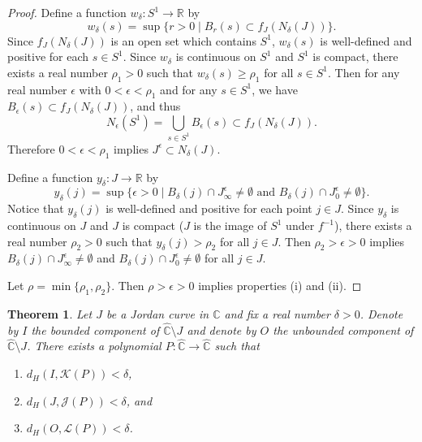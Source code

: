 \documentclass[a4paper,11pt,onecolumn]{amsart}
\newtheorem{theorem}{Theorem}[section]
\theoremstyle{definition}
\begin{document}
\begin{proof}
Define a function $w_{\delta}:S^1 \rightarrow \mathbb{R}$ by 
$$w_{\delta}(s) = \sup \{r>0 \mid B_r(s) \subset f_J(N_{\delta}(J))\}.$$
Since $f_J(N_{\delta}(J))$ is an open set which contains $S^1$,  $w_{\delta}(s)$ is well-defined and positive for each $s \in S^1$.  Since $w_{\delta}$ is continuous on $S^1$ and $S^1$ is compact, there exists a real number $ \rho_1 > 0$ such that $w_{\delta}(s) \geq \rho_1$ for all $s \in S^1$.  Then for any real number $\epsilon$ with $0 < \epsilon < \rho_1$ and for any $s \in S^1$, we have 
$B_{\epsilon}(s) \subset f_J(N_{\delta}(J))$, and thus $$N_{\epsilon}(S^1) = \bigcup_{s \in S^1} B_{\epsilon}(s)  \subset f_J(N_{\delta}(J)).$$ Therefore $0 < \epsilon < \rho_1$ implies $J^{\epsilon} \subset N_{\delta}(J)$. 

Define a function $y_{\delta}:J \rightarrow \mathbb{R}$ by 
$$y_{\delta}(j) =  \sup \{\epsilon > 0 \mid B_{\delta}(j) \cap J^{\epsilon}_{\infty} \not = \emptyset \textrm{ and } B_{\delta}(j) \cap J^{\epsilon}_0 \not = \emptyset  \}.$$  Notice that $y_{\delta}(j)$ is well-defined and positive for each point $j \in J$.  Since $y_{\delta}$ is continuous on $J$ and $J$ is compact ($J$ is the image of $S^1$ under $f^{-1}$), there exists a real number $\rho_2 > 0$ such that $y_{\delta}(j) > \rho_2$ for all $j \in J$.  Then $\rho_2 > \epsilon > 0$ implies $B_{\delta}(j) \cap J_{\infty}^{\epsilon} \not = \emptyset$ and $B_{\delta}(j) \cap J_0^{\epsilon} \not = \emptyset$ for all $j \in J$.  

Let $\rho = \min\{\rho_1, \rho_2\}$.  Then $\rho>\epsilon > 0$ implies properties (i) and (ii). 
\end{proof}

\begin{theorem} \label{t:HausdorffVersion}
Let $J$ be a Jordan curve in $\mathbb{C}$ and fix a real number $\delta > 0$.   Denote by $I$ the bounded component of $\hat{\mathbb{C}}\setminus J$ and denote by $O$ the unbounded component of $\hat{\mathbb{C}}\setminus J$.  There exists a polynomial $P:\hat{\mathbb{C}} \rightarrow \hat{\mathbb{C}}$ such that 
\begin{enumerate}
\item $d_H(I, \mathcal{K}(P)) < \delta$,
\item $d_H(J, \mathcal{J}(P)) < \delta$, and 
\item $d_H(O, \mathcal{L}(P)) < \delta$. 
\end{enumerate}
\end{theorem}
 
\end{document}
